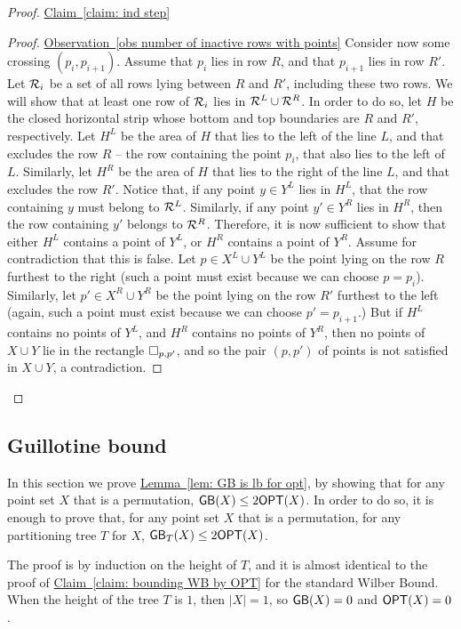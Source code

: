 \documentclass[11pt]{article}
\numberwithin{equation}{section}
\theoremstyle{definition}
\theoremstyle{plain}
\newcommand{\expref}[2]{\hyperref[#2]{#1~\ref{#2}}}
\begin{document}
\begin{proof}{\expref{Claim}{claim: ind step}}
\begin{proof}{\expref{Observation}{obs number of inactive rows with points}}
Consider now some crossing $(p_i,p_{i+1})$. Assume that $p_i$ lies in row $R$, and that $p_{i+1}$ lies in row $R'$. Let ${\mathcal R}_i$ be a set of all rows lying between $R$ and $R'$, including these two rows. We will show that at least one row of ${\mathcal R}_i$ lies in ${\mathcal R}^L\cup {\mathcal R}^R$. In order to do so, let $H$ be the closed horizontal strip whose bottom and top boundaries are $R$ and $R'$, respectively. Let $H^L$ be the area of $H$ that lies to the left of the line $L$, and that excludes the row $R$ -- the row containing the point $p_i$, that also lies to the left of $L$. Similarly, let $H^R$ be the area of $H$ that lies to the right of the line $L$, and that excludes the row $R'$. Notice that, if any point $y\in Y^L$ lies in $H^L$, that the row containing $y$  must belong to ${\mathcal R}^L$. Similarly, if any point $y'\in Y^R$ lies in $H^R$, then the row containing $y'$ belongs to ${\mathcal R}^R$. Therefore, it is now sufficient to show that either $H^L$ contains a point of $Y^L$, or $H^R$ contains a point of $Y^R$. Assume for contradiction that this is false. Let $p\in X^L\cup Y^L$ be the point lying on the row $R$ furthest to the right (such a point must exist because we can choose $p=p_i$). Similarly, let $p'\in X^R\cup Y^R$ be the point lying on the row $R'$ furthest to the left (again, such a point must exist because we can choose $p'=p_{i+1}$.) But if $H^L$ contains no points of $Y^L$, and $H^R$ contains no points of $Y^R$, then no points of $X\cup Y$ lie in the rectangle $\Box_{p,p'}$, and so the pair $(p,p')$ of points is not satisfied in $X\cup Y$, a contradiction.
\end{proof}	
\end{proof}

\subsection{Guillotine bound}
\label{sec: GB proof} 

In this section we prove \expref{Lemma}{lem: GB is lb for opt}, by showing that for any point set $X$ that is a permutation, $\mathsf{GB}(X)\leq 2\mbox{\sf OPT}(X)$. In order to do so, it is enough to prove that, for any point set $X$ that is a permutation, for any partitioning tree $T$ for $X$, $\mathsf{GB}_T(X) \leq 2\mbox{\sf OPT}(X)$. 

The proof is by induction on the height of $T$, and it is almost identical to the proof of \expref{Claim}{claim: bounding WB by OPT} for the standard Wilber Bound. When the height of the tree $T$ is $1$, then $|X|=1$, so $\mathsf{GB}(X)=0$ and $\mbox{\sf OPT}(X)=0$.
\end{document}
